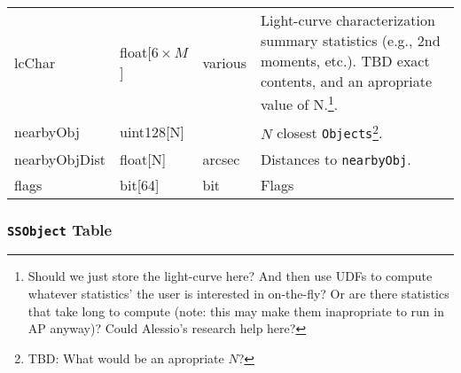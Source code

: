 \documentclass[12pt]{article}
\newcommand{\code}[1]{\texttt{#1}}
\newcommand{\Objects}{\code{Objects}\xspace}
\newcommand{\SSObject}{\code{SSObject}\xspace}
\begin{document}
\begin{center}
\begin{longtable}{p{3cm}p{2cm}p{2cm}p{5cm}}
lcChar   & float[$6\times{}M$] & various & Light-curve characterization summary statistics (e.g., 2nd moments, etc.). TBD exact contents, and an apropriate value of N.\footnote{Should we just store the light-curve here? And then use UDFs to compute whatever statistics' the user is interested in on-the-fly? Or are there statistics that take long to compute (note: this may make them inapropriate to run in AP anyway)? Could Alessio's research help here?}. \\

nearbyObj   & uint128[N] & ~ & $N$ closest \Objects\footnote{TBD: What would be an apropriate $N$?}. \\

nearbyObjDist   & float[N] & arcsec & Distances to \texttt{nearbyObj}. \\

flags & bit[64] & bit & Flags \\ \hline

\end{longtable}
\end{center}

\subsubsection{\SSObject Table}
\end{document}
